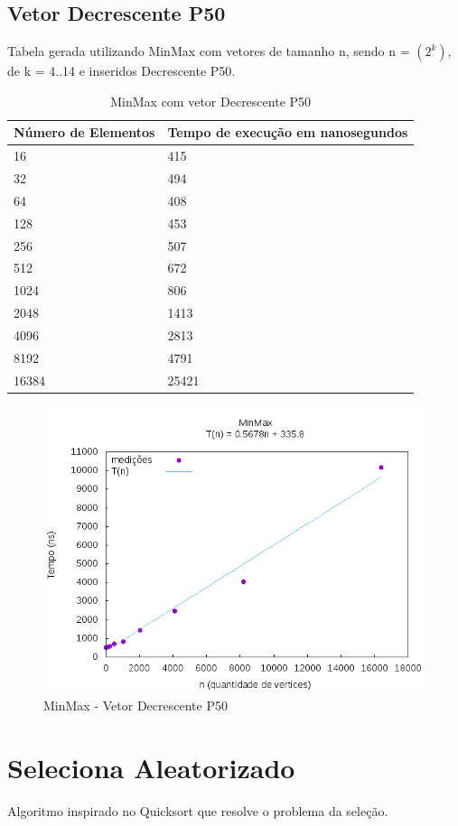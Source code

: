 \documentclass[12pt,a4paper,twoside]{report}
\begin{document}
\subsection{Vetor Decrescente P50}
Tabela gerada utilizando MinMax com vetores de tamanho n, sendo n = $(2^k)$, de k = 4..14 e inseridos Decrescente P50.
\begin{table}[H]
\centering
\caption{MinMax com vetor Decrescente P50}
\label{my-label}
\begin{tabular}{|l|l|}
\hline
\multicolumn{1}{|c|}{\textbf{Número de Elementos}} & \multicolumn{1}{c|}{\textbf{Tempo de execução em nanosegundos}} \\ \hline
16 & 415 \\ \hline
32 & 494 \\ \hline
64 & 408 \\ \hline
128 & 453 \\ \hline
256 & 507 \\ \hline
512 & 672 \\ \hline
1024 & 806 \\ \hline
2048 & 1413 \\ \hline
4096 & 2813 \\ \hline
8192 & 4791 \\ \hline
16384 & 25421 \\ \hline
\end{tabular}
\end{table}

\begin{figure}[H]
    \centering
    \includegraphics[width=0.7\linewidth]{graficos/Min Max/Decrescente P50/MinMax.png}
  \caption{MinMax - Vetor Decrescente P50}
\end{figure}

\section{Seleciona Aleatorizado}
Algoritmo inspirado no Quicksort que resolve o problema da seleção.
\end{document}
